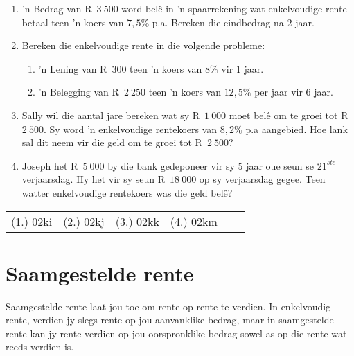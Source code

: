\begin{exercises}{}
{
    \begin{enumerate}[label=\textbf{\arabic*}.]
	\item ’n Bedrag van R~$3~500$ word belê in ’n spaarrekening wat enkelvoudige rente betaal teen ’n koers van $7,5\%$ p.a. Bereken die eindbedrag na 2 jaar.

	\item Bereken die enkelvoudige rente in die volgende probleme:
	\begin{enumerate}
	    \item ’n Lening van R~$300$  teen ’n koers van $8\%$ vir 1 jaar.

	    \item ’n Belegging van R~$2~250$ teen ’n koers van $12,5\%$ per jaar vir 6 jaar.
	\end{enumerate}

	\item Sally wil die aantal jare bereken wat sy R~$1~000$ moet bel\^e om te groei tot R~$2~500$. Sy word 'n enkelvoudige rentekoers van $8,2\%$ p.a aangebied. Hoe lank sal dit neem vir die geld om te groei tot R~$2~500$?
	\item Joseph het R~$5~000$ by die bank gedeponeer vir sy $5$ jaar oue seun se $21^{ste}$ verjaarsdag. Hy het vir sy seun R~$18~000$ op sy verjaarsdag gegee. Teen watter enkelvoudige rentekoers was die geld belê?
    \end{enumerate}

\par \practiceinfo
\par \begin{tabular}[h]{cccccc}
(1.)	02ki	&
(2.)	02kj	&
(3.)	02kk	&
(4.)	02km	&
\end{tabular}
}
\end{exercises}






\section{Saamgestelde rente}

Saamgestelde rente laat jou toe om rente op rente te verdien. In enkelvoudig rente, verdien jy slegs rente op jou aanvanklike bedrag, maar in saamgestelde rente kan jy rente verdien op jou oorspronklike bedrag sowel as op die rente wat reeds verdien is.\par

